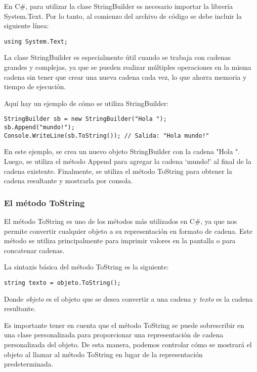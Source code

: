 \documentclass[executivepaper]{article}
\begin{document}
En C\#, para utilizar la clase StringBuilder es necesario importar la librería System.Text. Por lo tanto, al comienzo del archivo de código se debe incluir la siguiente línea:
\begin{lstlisting}
using System.Text;    
\end{lstlisting}

La clase StringBuilder es especialmente útil cuando se trabaja con cadenas grandes y complejas, ya que se pueden realizar múltiples operaciones en la misma cadena sin tener que crear una nueva cadena cada vez, lo que ahorra memoria y tiempo de ejecución.

Aquí hay un ejemplo de cómo se utiliza StringBuilder:
\begin{lstlisting}
StringBuilder sb = new StringBuilder("Hola ");
sb.Append("mundo!");
Console.WriteLine(sb.ToString()); // Salida: "Hola mundo!"    
\end{lstlisting}
En este ejemplo, se crea un nuevo objeto StringBuilder con la cadena "Hola ". Luego, se utiliza el método Append para agregar la cadena \enquote*{mundo!} al final de la cadena existente. Finalmente, se utiliza el método ToString para obtener la cadena resultante y mostrarla por consola.

\subsubsection*{El método ToString}

El método ToString es uno de los métodos más utilizados en C\#, ya que nos permite convertir cualquier objeto a su representación en formato de cadena. Este método se utiliza principalmente para imprimir valores en la pantalla o para concatenar cadenas.

La sintaxis básica del método ToString es la siguiente:

\begin{lstlisting}[language={[Sharp]C}]
string texto = objeto.ToString();
\end{lstlisting}

Donde \emph{objeto} es el objeto que se desea convertir a una cadena y \emph{texto} es la cadena resultante.

Es importante tener en cuenta que el método ToString se puede sobrescribir en una clase personalizada para proporcionar una representación de cadena personalizada del objeto. De esta manera, podemos controlar cómo se mostrará el objeto al llamar al método ToString en lugar de la representación predeterminada.
\end{document}
